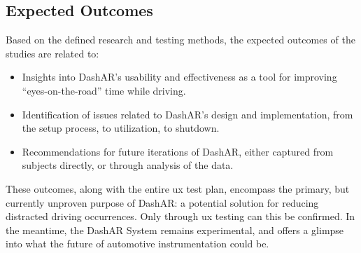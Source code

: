     \subsection{Expected Outcomes}
        \par Based on the defined research and testing methods, the expected outcomes of the studies are related to:

        \begin{itemize}
            \item Insights into DashAR's usability and effectiveness as a tool for improving ``eyes-on-the-road'' time while driving.
            \item Identification of issues related to DashAR's design and implementation, from the setup process, to utilization, to shutdown.
            \item Recommendations for future iterations of DashAR, either captured from subjects directly, or through analysis of the data.
        \end{itemize}

        \par These outcomes, along with the entire \gls{ux} test plan, encompass the primary, but currently unproven purpose of DashAR: a potential solution for reducing distracted driving occurrences. Only through \gls{ux} testing can this be confirmed. In the meantime, the DashAR System remains experimental, and offers a glimpse into what the future of automotive instrumentation could be.
